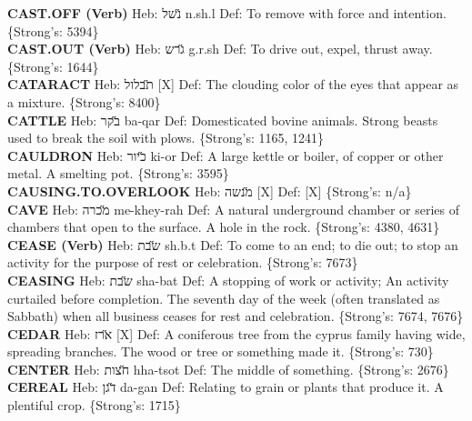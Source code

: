 {\textbf{CAST.OFF (Verb)} Heb: {\large\H נשל} n.sh.l Def: To remove with force and intention. \{Strong's: 5394\}\hfill{}\\

\textbf{CAST.OUT (Verb)} Heb: {\large\H גרש} g.r.sh Def: To drive out, expel, thrust away. \{Strong's: 1644\}\hfill{}\\

\textbf{CATARACT} Heb: {\large\H תבלול} {[}X{]} Def: The clouding color of the eyes that appear as a mixture. \{Strong's: 8400\}\hfill{}\\

\textbf{CATTLE} Heb: {\large\H בקר} ba-qar Def: Domesticated bovine animals. Strong beasts used to break the soil with plows. \{Strong's: 1165, 1241\}\hfill{}\\

\textbf{CAULDRON} Heb: {\large\H כיור} ki-or Def: A large kettle or boiler, of copper or other metal. A smelting pot. \{Strong's: 3595\}\hfill{}\\

\textbf{CAUSING.TO.OVERLOOK} Heb: {\large\H מנשה} {[}X{]} Def: {[}X{]} \{Strong's: n/a\}\hfill{}\\

\textbf{CAVE} Heb: {\large\H מכרה} me-khey-rah Def: A natural underground chamber or series of chambers that open to the surface. A hole in the rock. \{Strong's: 4380, 4631\}\hfill{}\\

\textbf{CEASE (Verb)} Heb: {\large\H שבת} sh.b.t Def: To come to an end; to die out; to stop an activity for the purpose of rest or celebration. \{Strong's: 7673\}\hfill{}\\

\textbf{CEASING} Heb: {\large\H שבת} sha-bat Def: A stopping of work or activity; An activity curtailed before completion. The seventh day of the week (often translated as Sabbath) when all business ceases for rest and celebration. \{Strong's: 7674, 7676\}\hfill{}\\

\textbf{CEDAR} Heb: {\large\H ארז} {[}X{]} Def: A coniferous tree from the cyprus family having wide, spreading branches. The wood or tree or something made it. \{Strong's: 730\}\hfill{}\\

\textbf{CENTER} Heb: {\large\H חצות} hha-tsot Def: The middle of something. \{Strong's: 2676\}\hfill{}\\

\textbf{CEREAL} Heb: {\large\H דגן} da-gan Def: Relating to grain or plants that produce it. A plentiful crop. \{Strong's: 1715\}\hfill{}\\

}
